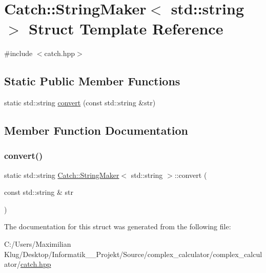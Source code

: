 \hypertarget{struct_catch_1_1_string_maker_3_01std_1_1string_01_4}{}\section{Catch\+:\+:String\+Maker$<$ std\+:\+:string $>$ Struct Template Reference}
\label{struct_catch_1_1_string_maker_3_01std_1_1string_01_4}


{\ttfamily \#include $<$catch.\+hpp$>$}

\subsection*{Static Public Member Functions}
\begin{DoxyCompactItemize}
\item 
static std\+::string \mbox{\hyperlink{struct_catch_1_1_string_maker_3_01std_1_1string_01_4_ae065b2ecc5c1a6c4409cf06d604bd66d}{convert}} (const std\+::string \&str)
\end{DoxyCompactItemize}


\subsection{Member Function Documentation}
\mbox{\label{struct_catch_1_1_string_maker_3_01std_1_1string_01_4_ae065b2ecc5c1a6c4409cf06d604bd66d}} 
\subsubsection{\texorpdfstring{convert()}{convert()}}
{\footnotesize\ttfamily static std\+::string \mbox{\hyperlink{struct_catch_1_1_string_maker}{Catch\+::\+String\+Maker}}$<$ std\+::string $>$\+::convert (\begin{DoxyParamCaption}\item[{const std\+::string \&}]{str }\end{DoxyParamCaption})\hspace{0.3cm}{\ttfamily [static]}}



The documentation for this struct was generated from the following file\+:\begin{DoxyCompactItemize}
\item 
C\+:/\+Users/\+Maximilian Klug/\+Desktop/\+Informatik\+\_\+\_\+\+Projekt/\+Source/complex\+\_\+calculator/complex\+\_\+calculator/\mbox{\hyperlink{catch_8hpp}{catch.\+hpp}}\end{DoxyCompactItemize}
